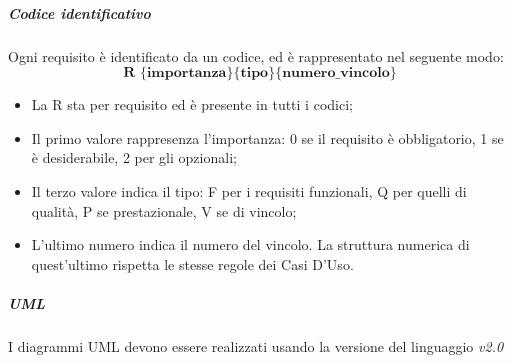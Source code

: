 			
			\subparagraph{Codice identificativo} \Spazio
			Ogni requisito è identificato da un codice, ed è rappresentato nel seguente modo:
			$$ \textbf{R \{importanza\}\{tipo\}\{numero\_vincolo\} } $$
			
			\begin{itemize}
				\item La R sta per requisito ed è presente in tutti i codici;
				\item Il primo valore rappresenza l'importanza: 0 se il requisito è obbligatorio, 1 se è desiderabile, 2 per gli opzionali;
				\item Il terzo valore indica il tipo: F per i requisiti funzionali, Q per quelli di qualità, P se prestazionale, V se di vincolo;
				\item L'ultimo numero indica il numero del vincolo. La struttura numerica di quest'ultimo rispetta le stesse regole dei Casi D'Uso.
			\end{itemize}
		
	        
		    
			\subparagraph{UML} \Spazio
			I diagrammi UML devono essere realizzati usando la versione del linguaggio \textit{v2.0}
			
			

